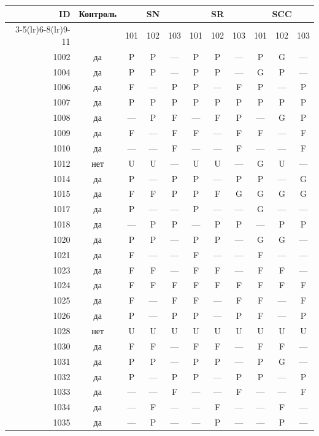 \begin{table}[p]\centering\small
\begin{tabular*}{\textwidth}{@{\extracolsep{\fill}}rc*{9}{c}@{}}\toprule
ID & Контроль & \multicolumn{3}{c}{SN} & \multicolumn{3}{c}{SR} & \multicolumn{3}{c}{SCC}\\
\cmidrule(lr){3-5}\cmidrule(lr){6-8}\cmidrule(lr){9-11}
 & & 101 & 102 & 103 & 101 & 102 & 103 & 101 & 102 & 103\\\midrule
1002 & да & P & P & — & P & P & — & P & G & —\\
1004 & да & P & P & — & P & P & — & G & P & —\\
1006 & да & F & — & P & P & — & F & P & — & P\\
1007 & да & P & P & P & P & P & P & P & P & P\\
1008 & да & — & P & F & — & F & P & — & G & P\\
1009 & да & F & — & F & F & — & F & F & — & F\\
1010 & да & — & — & F & — & — & F & — & — & F\\
1012 & нет & U & U & — & U & U & — & G & U & —\\
1014 & да & P & — & P & P & — & P & P & — & G\\
1015 & да & F & F & P & P & F & G & G & G & G\\
1017 & да & P & — & — & P & — & — & G & — & —\\
1018 & да & — & P & P & — & P & P & — & P & P\\
1020 & да & P & P & — & P & P & — & G & G & —\\
1021 & да & F & — & — & F & — & — & F & — & —\\
1023 & да & F & F & — & F & F & — & F & F & —\\
1024 & да & F & F & F & F & F & F & F & F & F\\
1025 & да & F & — & F & F & — & F & F & — & F\\
1026 & да & P & — & P & P & — & P & F & — & P\\
1028 & нет & U & U & U & U & U & U & U & U & U\\
1030 & да & F & F & — & F & F & — & F & F & —\\
1031 & да & P & P & — & P & P & — & P & G & —\\
1032 & да & P & — & P & P & — & P & P & — & P\\
1033 & да & — & — & F & — & — & F & — & — & F\\
1034 & да & — & F & — & — & F & — & — & F & —\\
1035 & да & — & P & — & — & P & — & — & P & —\\

\end{tabular*}
\end{table}
